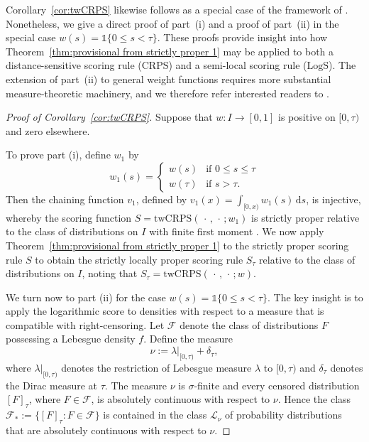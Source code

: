 \documentclass[10pt]{article} %
\theoremstyle{theorem}
\theoremstyle{definition}
\newcommand{\dd}{\mathrm{d}}
\newcommand{\one}{\mathds{1}}
\newcommand{\twCRPS}{\mathrm{twCRPS}}
\newcommand{\CRPS}{\mathrm{CRPS}}
\newcommand{\LogS}{\mathrm{LogS}}
\begin{document}
Corollary~\ref{cor:twCRPS} likewise follows as a special case of the framework of \citet{de2025localizing}. Nonetheless, we give a direct proof of part~(i) and a proof of part~(ii) in the special case $w(s)=\one\{0\leq s < \tau\}$. These proofs provide insight into how Theorem~\ref{thm:provisional from strictly proper 1} may be applied to both a distance-sensitive scoring rule ($\CRPS$) and a semi-local scoring rule ($\LogS$). The extension of part~(ii) to general weight functions requires more substantial measure-theoretic machinery, and we therefore refer interested readers to \citet{de2025localizing}.

\begin{proof}[Proof of Corollary~\ref{cor:twCRPS}]
Suppose that $w:I\to[0,1]$ is positive on $[0,\tau)$ and zero elsewhere. 

To prove part (i), define $w_1$ by
\[
w_1(s)=
\begin{cases}
w(s) & \text{if } 0 \leq s \leq \tau \\
w(\tau) & \text{if } s > \tau.
\end{cases}
\]
Then the chaining function $v_1$, defined by $v_1(x)=\int_{[0,x)}w_1(s)\,\dd s$, is injective, whereby the scoring function $S=\twCRPS(\,\cdot\,,\,\cdot\,;w_1)$ is strictly proper relative to the class of distributions on $I$ with finite first moment \citep[Proposition~3]{allen2023evaluating}. We now apply Theorem~\ref{thm:provisional from strictly proper 1} to the strictly proper scoring rule $S$ to obtain the strictly locally proper scoring rule $S_\tau$ relative to the class of distributions on $I$, noting that  $S_\tau=\twCRPS(\,\cdot\,,\,\cdot\,;w)$.

We turn now to part (ii) for the case $w(s)=\one\{0\leq s < \tau\}$. The key insight is to apply the logarithmic score to densities with respect to a measure that is compatible with right-censoring. Let $\mathcal{F}$ denote the class of distributions $F$ possessing a Lebesgue density $f$. Define the measure
\[
\nu := \lambda\vert_{[0,\tau)} + \delta_\tau,
\]
where  $\lambda\vert_{[0,\tau)}$ denotes the restriction of Lebesgue measure $\lambda$ to $[0,\tau)$ and $\delta_\tau$ denotes the Dirac measure at $\tau$. The measure $\nu$ is $\sigma$-finite and every censored distribution $[F]_\tau$, where $F\in\mathcal{F}$, is absolutely continuous with respect to $\nu$. Hence the class $\mathcal{F}_*:=\{[F]_\tau: F\in\mathcal{F}\}$ is contained in the class $\mathcal{L}_\nu$ of probability distributions that are absolutely continuous with respect to $\nu$.


\end{proof}
\end{document}
